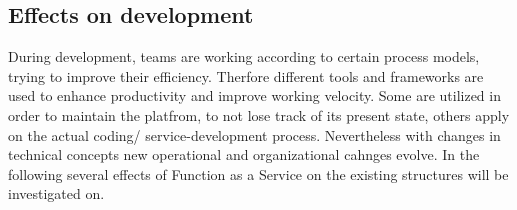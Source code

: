 \documentclass[11pt]{article}
\begin{document}
\subsection{Effects on development}
During development, teams are working according to certain process models, trying to improve their efficiency. Therfore different tools and frameworks are used to enhance productivity and improve working velocity. Some are utilized in order to maintain the platfrom, to not lose track of its present state, others apply on the actual coding/ service-development process. Nevertheless with changes in technical concepts new operational and organizational cahnges evolve. In the following several effects of Function as a Service on the existing structures will be investigated on. %
\end{document}
